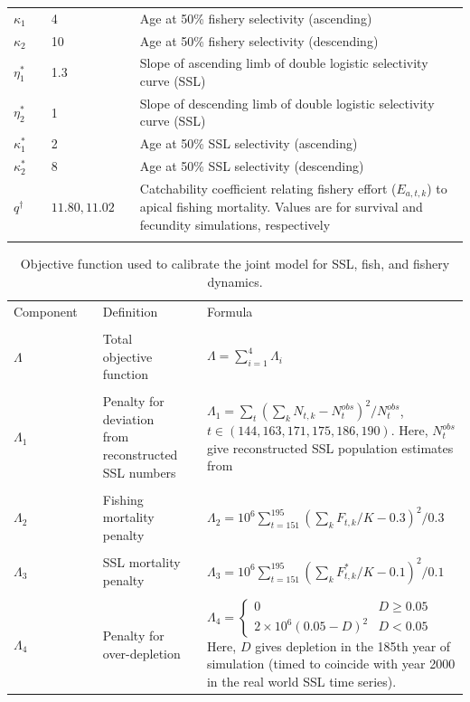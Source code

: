 \documentclass[11pt]{article}
\begin{document}
\begin{longtable}{p{2.5cm}lp{2.7cm}l p{8cm}}
$\kappa_1$ & & 4 & & Age at 50\% fishery selectivity (ascending) \\
$\kappa_2$ & & 10 & & Age at 50\% fishery selectivity (descending) \\
$\eta_1^*$ & & 1.3 & & Slope of ascending limb of double logistic selectivity curve (SSL) \\
$\eta_2^*$ & & 1 & & Slope of descending limb of double logistic selectivity curve (SSL) \\
$\kappa_1^*$ & & 2 & & Age at 50\% SSL selectivity (ascending) \\
$\kappa_2^*$ & & 8 & & Age at 50\% SSL selectivity (descending) \\
$ q ^\dag $ & & $11.80,11.02$ & & Catchability coefficient relating fishery effort ($E_{a,t,k}$) to apical fishing mortality.  Values are for survival and fecundity simulations, respectively \\
\vspace{4in}
\end{longtable}

\begin{table}
\caption{\large Objective function used to calibrate the joint model for SSL, fish, and
fishery dynamics.}
\label{tab:objfun}
\begin{tabular}{llp{4cm}lp{7cm}}
\\
\hline \hline
Component & & Definition & & Formula \\
\cline{1-1} \cline{3-3} \cline{5-5}
\\
$\Lambda$ & & Total objective function & & $\Lambda=\sum_{i=1}^4 \Lambda_i$ \\
& & & & \\
$\Lambda_1$ & & Penalty for deviation from reconstructed SSL numbers & & $\Lambda_1= \sum_t (\sum_k N_{t,k}-N_t^{obs})^2/N_t^{obs}$, $t \in (144,163,171,175,186,190)$. Here, $N_t^{obs}$ give reconstructed SSL population estimates from \citet{Goodman2008} \\
& & & & \\
$\Lambda_2$ & & Fishing mortality penalty & & $\Lambda_2=10^6 \sum_{t=151}^{195} (\sum_k F_{t,k}/K - 0.3)^2/0.3$ \\
& & & & \\
$\Lambda_3$ & & SSL mortality penalty & & $\Lambda_3=10^6 \sum_{t=151}^{195} (\sum_k F_{t,k}^*/K - 0.1)^2/0.1$ \\
& & & & \\
$\Lambda_4$ & & Penalty for over-depletion & & $ \Lambda_4 = \left\{ \begin{array}{cc} 0 &  D \ge 0.05 \\ 2 \times 10^6 (0.05-D)^2 &  D < 0.05 \end{array} \right.$  Here, $D$ gives depletion in the 185th year of simulation (timed to coincide with year 2000 in the real world SSL time series).\\
\bottomrule
\end{tabular}
\vspace{4in}
\end{table}
\end{document}
